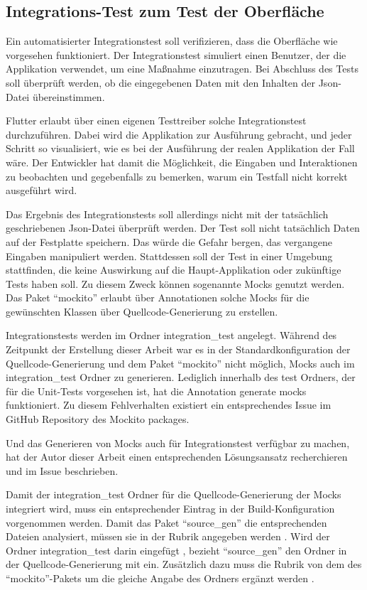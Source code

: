 \clearpage


\subsection{Integrations-Test zum Test der Oberfläche}


Ein automatisierter Integrationstest soll verifizieren, dass die Oberfläche wie vorgesehen funktioniert. Der Integrationstest simuliert einen Benutzer, der die Applikation verwendet, um eine Maßnahme einzutragen. Bei Abschluss des Tests soll überprüft werden, ob die  eingegebenen Daten mit den Inhalten der Json-Datei übereinstimmen.

Flutter erlaubt über einen eigenen Testtreiber solche Integrationstest durchzuführen. Dabei wird die Applikation zur Ausführung gebracht, und jeder Schritt so visualisiert, wie es bei der Ausführung der realen Applikation der Fall wäre. Der Entwickler hat damit die Möglichkeit, die Eingaben und Interaktionen zu beobachten und gegebenfalls zu bemerken, warum ein Testfall nicht korrekt ausgeführt wird.

Das Ergebnis des Integrationstests soll allerdings nicht mit der tatsächlich geschriebenen Json-Datei überprüft werden. Der Test soll nicht tatsächlich Daten auf der Festplatte speichern. Das würde die Gefahr bergen, das  vergangene Eingaben manipuliert werden. Stattdessen soll der Test in einer Umgebung stattfinden, die keine Auswirkung auf die Haupt-Applikation oder zukünftige Tests haben soll. Zu diesem Zweck können sogenannte Mocks genutzt werden. Das Paket \enquote{mockito} erlaubt über Annotationen solche Mocks für die gewünschten Klassen  über Quellcode-Generierung zu erstellen.

Integrationstests werden im Ordner integration_test angelegt. Während des Zeitpunkt der Erstellung dieser Arbeit war es in der Standardkonfiguration der Quellcode-Generierung und dem Paket \enquote{mockito} nicht möglich, Mocks auch im integration_test Ordner zu generieren.  Lediglich innerhalb des test Ordners, der für die Unit-Tests vorgesehen ist, hat die Annotation generate mocks funktioniert. Zu diesem Fehlverhalten existiert ein entsprechendes Issue im GitHub Repository  des Mockito packages.  

Und das Generieren von Mocks auch für Integrationstest verfügbar zu machen, hat der Autor dieser Arbeit einen entsprechenden Lösungsansatz recherchieren und im Issue beschrieben.  

Damit der integration_test Ordner für die Quellcode-Generierung der Mocks integriert wird, muss ein entsprechender Eintrag in der Build-Konfiguration vorgenommen werden. Damit das Paket \enquote{source_gen} die entsprechenden Dateien analysiert, müssen sie in der Rubrik  angegeben werden . Wird der Ordner integration_test darin eingefügt , bezieht \enquote{source_gen} den Ordner in der Quellcode-Generierung mit ein. Zusätzlich dazu muss die Rubrik  von dem  des \enquote{mockito}-Pakets  um die gleiche Angabe des Ordners ergänzt werden .

